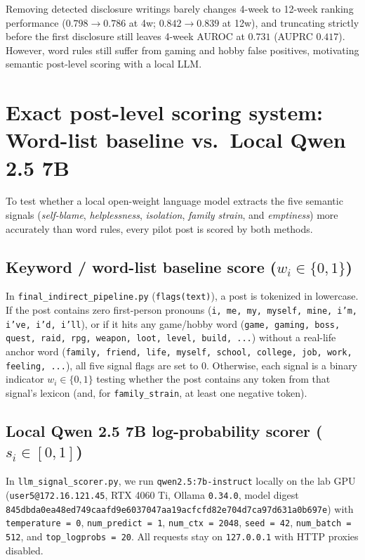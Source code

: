 \documentclass[11pt,a4paper]{article}
\begin{document}
Removing detected disclosure writings barely changes 4-week to 12-week ranking performance ($0.798 \to 0.786$ at 4w; $0.842 \to 0.839$ at 12w), and truncating strictly before the first disclosure still leaves 4-week AUROC at $0.731$ (AUPRC $0.417$). However, word rules still suffer from gaming and hobby false positives, motivating semantic post-level scoring with a local LLM.

\section{Exact post-level scoring system: Word-list baseline vs.\ Local Qwen 2.5 7B}
To test whether a local open-weight language model extracts the five semantic signals (\emph{self-blame}, \emph{helplessness}, \emph{isolation}, \emph{family strain}, and \emph{emptiness}) more accurately than word rules, every pilot post is scored by both methods.

\subsection{Keyword / word-list baseline score ($w_i \in \{0,1\}$)}
In \texttt{final\_indirect\_pipeline.py} (\texttt{flags(text)}), a post is tokenized in lowercase. If the post contains zero first-person pronouns (\texttt{i, me, my, myself, mine, i'm, i've, i'd, i'll}), or if it hits any game/hobby word (\texttt{game, gaming, boss, quest, raid, rpg, weapon, loot, level, build, ...}) without a real-life anchor word (\texttt{family, friend, life, myself, school, college, job, work, feeling, ...}), all five signal flags are set to $0$. Otherwise, each signal is a binary indicator $w_i \in \{0,1\}$ testing whether the post contains any token from that signal's lexicon (and, for \texttt{family\_strain}, at least one negative token).

\subsection{Local Qwen 2.5 7B log-probability scorer ($s_i \in [0,1]$)}
In \texttt{llm\_signal\_scorer.py}, we run \texttt{qwen2.5:7b-instruct} locally on the lab GPU (\texttt{user5@172.16.121.45}, RTX 4060 Ti, Ollama \texttt{0.34.0}, model digest \texttt{845dbda0ea48ed749caafd9e6037047aa19acfcfd82e704d7ca97d631a0b697e}) with \texttt{temperature = 0}, \texttt{num\_predict = 1}, \texttt{num\_ctx = 2048}, \texttt{seed = 42}, \texttt{num\_batch = 512}, and \texttt{top\_logprobs = 20}. All requests stay on \texttt{127.0.0.1} with HTTP proxies disabled.
\end{document}
